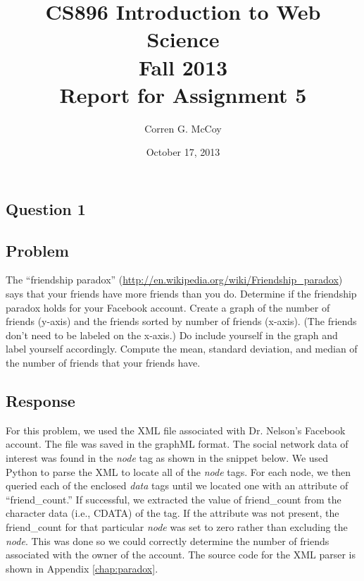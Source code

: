 \documentclass[letterpaper,11pt]{report}
\begin{document}
 
\begin{savenotes}
\pagestyle{plain}
\title{CS896 Introduction to Web Science\\Fall 2013\\Report for Assignment 5}
\author{Corren G. McCoy}
 
\date{October 17, 2013}
\maketitle

\renewcommand*\thesection{\arabic{section}}
\setcounter{section}{0}

\setcounter{tocdepth}{4}
\tableofcontents
 \listoffigures
\newpage


\section{Question 1}
\subsection{Problem}The ``friendship paradox'' (\url{http://en.wikipedia.org/wiki/Friendship_paradox}) says that your friends have more friends than you do. Determine if the friendship paradox holds for your Facebook account.  Create a graph of the number of friends (y-axis) and the friends sorted by number of friends (x-axis).  (The friends don't need to be labeled on the x-axis.)  Do include yourself in the graph and label yourself accordingly. Compute the mean, standard deviation, and median of the number of friends that your friends have.
\subsection{Response}For this problem, we used the XML file associated with Dr. Nelson's Facebook account. The file was saved in the graphML format. The social network data of interest was found in the \emph{node} tag as shown in the snippet below. We used Python to parse the XML to locate all of the \emph{node} tags. For each node, we then queried each of the enclosed \emph{data} tags until we located one with an attribute of ``friend\_count.'' If successful, we extracted the value of friend\_count from the character data (i.e., CDATA) of the tag. If the attribute was not present, the friend\_count for that particular \emph{node} was set to zero rather than excluding the \emph{node}. This was done so we could correctly determine the number of friends associated with the owner of the account. The source code for the XML parser is shown in Appendix \ref{chap:paradox}. 


\end{savenotes}
\end{document}
